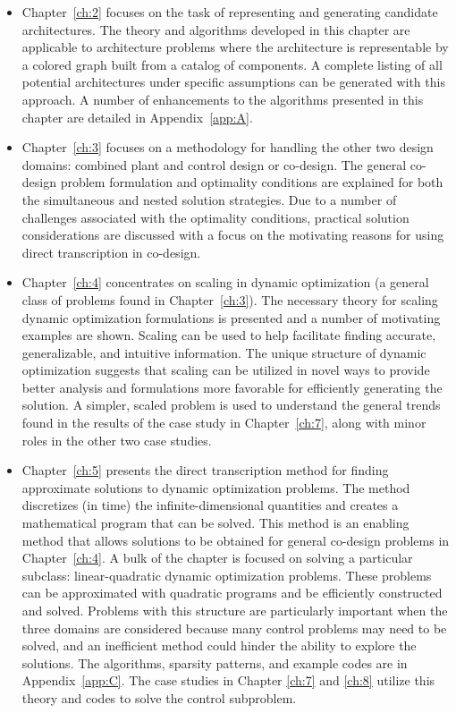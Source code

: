 \begin{itemize}
\item Chapter~\ref{ch:2} focuses on the task of representing and generating candidate architectures.
The theory and algorithms developed in this chapter are applicable to architecture problems where the architecture is representable by a colored graph built from a catalog of components.
A complete listing of all potential architectures under specific assumptions can be generated with this approach.
A number of enhancements to the algorithms presented in this chapter are detailed in Appendix~\ref{app:A}.

\item Chapter~\ref{ch:3} focuses on a methodology for handling the other two design domains: combined plant and control design or co-design.
The general co-design problem formulation and optimality conditions are explained for both the simultaneous and nested solution strategies.
Due to a number of challenges associated with the optimality conditions, practical solution  considerations are discussed with a focus on the motivating reasons for using direct transcription in co-design.

\item Chapter~\ref{ch:4} concentrates on scaling in dynamic optimization (a general class of problems found in Chapter~\ref{ch:3}). 
The necessary theory for scaling dynamic optimization formulations is presented and a number of motivating examples are shown. 
Scaling can be used to help facilitate finding accurate, generalizable, and intuitive information. The unique structure of dynamic optimization suggests that scaling can be utilized in novel ways to provide better analysis and formulations more favorable for efficiently generating the solution. 
A simpler, scaled problem is used to understand the general trends found in the results of the case study in Chapter~\ref{ch:7}, along with minor roles in the other two case studies.

\item Chapter~\ref{ch:5} presents the direct transcription method for finding approximate solutions to dynamic optimization problems.
The method discretizes (in time) the infinite-dimensional quantities and creates a mathematical program that can be solved.
This method is an enabling method that allows solutions to be obtained for general co-design problems in Chapter~\ref{ch:4}.
A bulk of the chapter is focused on solving a particular subclass: linear-quadratic dynamic optimization problems.
These problems can be approximated with quadratic programs and be efficiently constructed and solved.
Problems with this structure are particularly important when the three domains are considered because many control problems may need to be solved, and an inefficient method could hinder the ability to explore the solutions.
The algorithms, sparsity patterns, and example codes are in Appendix~\ref{app:C}.
The case studies in Chapter \ref{ch:7} and \ref{ch:8} utilize this theory and codes to solve the control subproblem.


\end{itemize}

